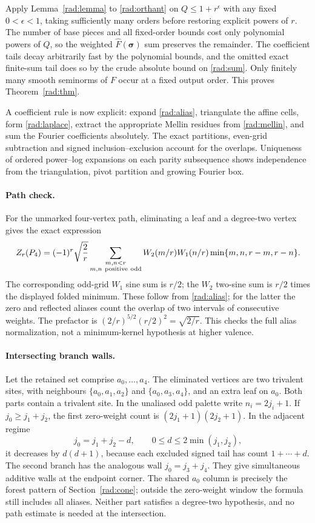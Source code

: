 Apply Lemma~\ref{rad:lemma} to \eqref{rad:orthant} on
\(Q\le1+r^\epsilon\) with any fixed \(0<\epsilon<1\),
taking sufficiently many orders before restoring explicit
powers of \(r\). The number of base pieces and all fixed-order
bounds cost only polynomial powers of \(Q\), so the weighted
\(\widehat F(\boldsymbol\sigma)\) sum preserves the remainder.
The coefficient tails decay arbitrarily fast by the
polynomial bounds, and the omitted exact finite-sum tail
does so by the crude absolute bound on \eqref{rad:sum}.
Only finitely many smooth seminorms of \(F\) occur at a fixed
output order. This proves Theorem~\ref{rad:thm}.

A coefficient rule is now explicit: expand \eqref{rad:alias},
triangulate the affine cells, form \eqref{rad:laplace}, extract
the appropriate Mellin residues from \eqref{rad:mellin}, and
sum the Fourier coefficients absolutely. The exact partitions,
even-grid subtraction and signed inclusion--exclusion account
for the overlaps. Uniqueness of ordered power--log expansions
on each parity subsequence shows independence from the
triangulation, pivot partition and growing Fourier box.

\paragraph{Path check.}
For the unmarked four-vertex path, eliminating a leaf and a
degree-two vertex gives the exact expression
\begin{equation}
 Z_r(P_4)=(-1)^r\sqrt{\frac2r}
 \sum_{\substack{m,n<r\\ m,n\ {\rm positive\ odd}}}
 W_2(m/r)W_1(n/r)\min\{m,n,r-m,r-n\}.
 \label{rad:p4}
\end{equation}
The corresponding odd-grid \(W_1\) sine sum is \(r/2\);
the \(W_2\) two-sine sum is \(r/2\) times the displayed folded
minimum. These follow from \eqref{rad:alias}; for the latter
the zero and reflected aliases count the overlap of two
intervals of consecutive weights. The prefactor is
\((2/r)^{5/2}(r/2)^2=\sqrt{2/r}\). This checks the full alias
normalization, not a minimum-kernel hypothesis at higher
valence.

\paragraph{Intersecting branch walls.}
Let the retained set comprise \(a_0,\ldots,a_4\). The eliminated
vertices are two trivalent sites, with neighbours
\(\{a_0,a_1,a_2\}\) and \(\{a_0,a_3,a_4\}\), and an extra
leaf on \(a_0\). Both parts contain a trivalent site. In the
unaliased odd palette write \(n_i=2j_i+1\). If \(j_0\ge j_1+j_2\),
the first zero-weight count is
\((2j_1+1)(2j_2+1)\). In the adjacent regime
\[
 j_0=j_1+j_2-d,\qquad 0\le d\le 2\min(j_1,j_2),
\]
it decreases by \(d(d+1)\),
because each excluded signed tail has count \(1+\cdots+d\).
The second branch has the analogous wall \(j_0=j_3+j_4\).
They give simultaneous additive walls at the endpoint corner.
The shared \(a_0\) column is precisely the forest pattern
of Section~\ref{rad:cone}; outside the zero-weight window
the formula still includes all aliases. Neither part satisfies
a degree-two hypothesis, and no path estimate is needed at
the intersection.

